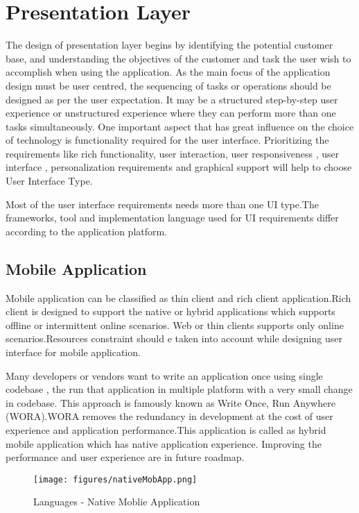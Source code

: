 \chapter{Presentation Layer}\label{ch:ch3label}

			The design of presentation layer begins by identifying the potential customer base, and understanding the objectives of the customer and task the user wish to accomplish when using the application. As the main focus of the application design must be user centred, the sequencing of tasks or operations should be designed as per the user expectation. It may be a structured step-by-step user experience or unstructured experience where they can perform more than one tasks simultaneously. One important aspect that has great influence on the choice of technology is functionality required for the user interface. Prioritizing the requirements like rich functionality, user interaction, user responsiveness , user interface , personalization requirements and graphical support will help to choose User Interface Type.
			
			Most of the user interface requirements needs more than one UI type.The frameworks, tool and implementation language used for UI requirements differ according  to the application platform.
			
\section{Mobile Application}
         
            	Mobile application can be classified as thin client and rich client application.Rich client is designed to support the native or hybrid applications which supports offline or intermittent online scenarios. Web or thin clients supports only online  scenarios.Resources constraint should e taken into account while designing user interface for mobile application.
            	
            	Many developers or vendors want to write an application once using single codebase , the run that application in multiple platform with a very small change in codebase. This approach is famously known as Write Once, Run Anywhere (WORA).WORA removes the redundancy in development at the cost of user experience and application performance.This application is called as hybrid mobile application which has native application experience. Improving the performance and user experience are in future roadmap.     
            	
\begin{figure}[!htb]
  \texttt{[image: figures/nativeMobApp.png]}
	 \caption{Languages - Native Moblie Application }
  \label{fig: Languages - Native Moblie Application}
\end{figure}		            	       	

